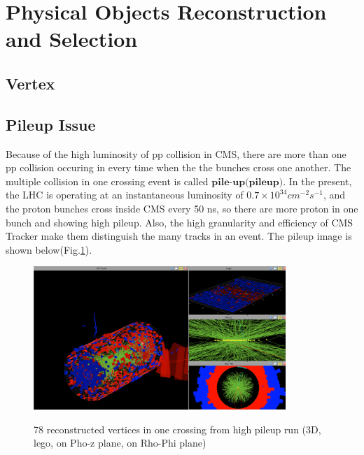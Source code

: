 

\section{Physical Objects Reconstruction and Selection}
\label{sec:PhysObj}

	\subsection{Vertex}
	\label{ssec:PhysObj_vertex}


	\subsection{Pileup Issue}
	\label{ssec:PhysObj_pu}{}

		Because of the high luminosity of pp collision in CMS, there are more than one pp collision occuring in every time when the the bunches cross one another. The multiple collision in one crossing event is called $\textbf{pile-up(pileup)}$. In the present, the LHC is operating at an instantaneous luminosity of $0.7\times10^{34} cm^{-2}s^{-1}$, and the proton bunches cross inside CMS every 50 ns, so there are more proton in one bunch and showing high pileup. Also, the high granularity and efficiency of CMS Tracker make them distinguish the many tracks in an event. The pileup image is shown below(Fig.\ref{PhysObj:fig:pileup_img}).

		\begin{figure}[H]
		\centering{}
	    	\includegraphics[width=0.85\textwidth]{Figures/PhysObj/pileup_image.png}\\
		\caption{78 reconstructed vertices in one crossing from high pileup run (3D, lego, on Pho-z plane, on Rho-Phi plane)}
		\label{PhysObj:fig:pileup_img}
		\end{figure}
		\FloatBarrier




